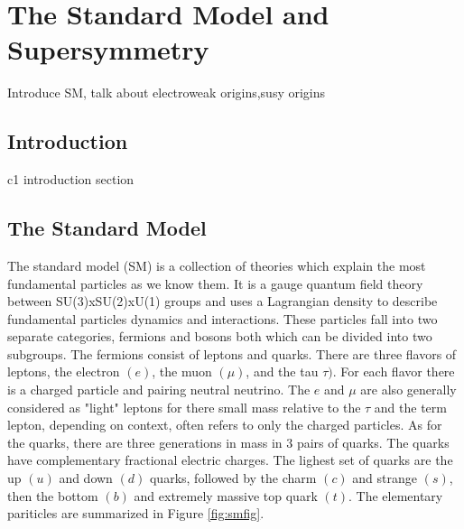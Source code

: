 



\setcounter{secnumdepth}{3}
\setcounter{tocdepth}{3}
\setlength{\parskip}{\smallskipamount}
\setlength{\parindent}{0pt}


\makeatletter


\providecommand{\tabularnewline}{\\}


\makeatother

%

\chapter{The Standard Model and Supersymmetry}

\begin{chapterabstract}
Introduce SM, talk about electroweak origins,susy origins
\end{chapterabstract}

\section{Introduction}

c1 introduction section

\section{The Standard Model}

The standard model (SM) is a collection of theories which explain the most fundamental particles as we know them. It is a gauge quantum field theory between SU(3)xSU(2)xU(1) groups and uses a Lagrangian density to describe fundamental particles  dynamics and interactions. These particles fall into two separate categories, fermions and bosons both which can be divided into two subgroups. The fermions consist of leptons and quarks. There are three flavors of leptons, the electron $(e)$, the muon $(\mu)$, and the tau $\tau)$. For each flavor there is a charged particle and pairing neutral neutrino. The $e$ and $\mu$ are also generally considered as "light" leptons for there small mass relative to the $\tau$ and the term lepton, depending on context, often refers to only the charged particles. As for the quarks, there are three generations in mass in 3 pairs of quarks. The quarks have complementary fractional electric charges. The lighest set of quarks are the up $(u)$ and down $(d)$ quarks, followed by the charm $(c)$ and strange $(s)$, then the bottom $(b)$ and extremely massive top quark $(t)$. The elementary pariticles are summarized in Figure \ref{fig:smfig}.

